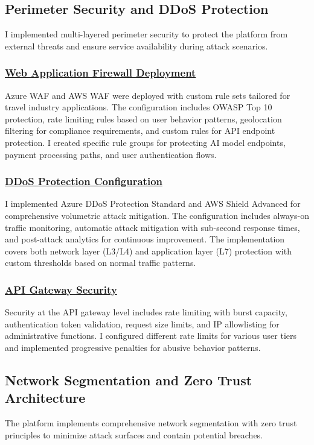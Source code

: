 \subsection{Perimeter Security and DDoS Protection}
I implemented multi-layered perimeter security to protect the platform from external threats and ensure service availability during attack scenarios.

\subsubsection*{\underline{Web Application Firewall Deployment}}
Azure WAF and AWS WAF were deployed with custom rule sets tailored for travel industry applications. The configuration includes OWASP Top 10 protection, rate limiting rules based on user behavior patterns, geolocation filtering for compliance requirements, and custom rules for API endpoint protection. I created specific rule groups for protecting AI model endpoints, payment processing paths, and user authentication flows.

\subsubsection*{\underline{DDoS Protection Configuration}}
I implemented Azure DDoS Protection Standard and AWS Shield Advanced for comprehensive volumetric attack mitigation. The configuration includes always-on traffic monitoring, automatic attack mitigation with sub-second response times, and post-attack analytics for continuous improvement. The implementation covers both network layer (L3/L4) and application layer (L7) protection with custom thresholds based on normal traffic patterns.

\subsubsection*{\underline{API Gateway Security}}
Security at the API gateway level includes rate limiting with burst capacity, authentication token validation, request size limits, and IP allowlisting for administrative functions. I configured different rate limits for various user tiers and implemented progressive penalties for abusive behavior patterns.

\subsection{Network Segmentation and Zero Trust Architecture}
The platform implements comprehensive network segmentation with zero trust principles to minimize attack surfaces and contain potential breaches.


